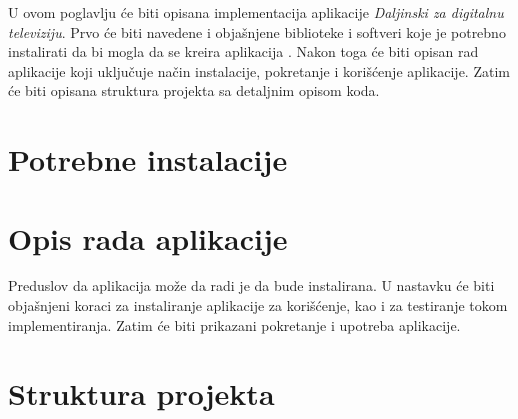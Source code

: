\documentclass[../TamaraIvanovicMasterRad.tex]{subfiles}
\begin{document}
U ovom poglavlju će biti opisana implementacija aplikacije \textit{Daljinski za digitalnu televiziju}. Prvo će biti navedene i objašnjene biblioteke i softveri koje je potrebno instalirati da bi mogla da se kreira aplikacija . Nakon toga će biti opisan rad aplikacije koji uključuje način instalacije, pokretanje i korišćenje aplikacije. Zatim će biti opisana struktura projekta sa detaljnim opisom koda.

\section{Potrebne instalacije} \label{opis_rada}

\section{Opis rada aplikacije} 
Preduslov da aplikacija može da radi je da bude instalirana. U nastavku će biti objašnjeni koraci za instaliranje aplikacije za korišćenje, kao i za testiranje tokom implementiranja. Zatim će biti prikazani pokretanje i upotreba aplikacije. 





\section{Struktura projekta}


\end{document}
